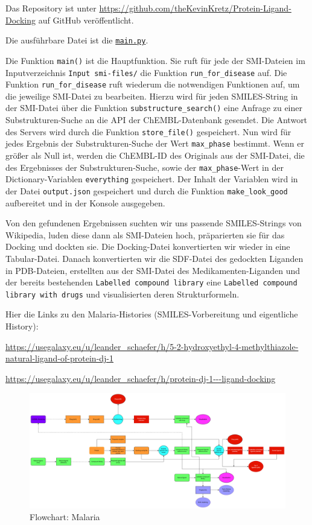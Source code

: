 \documentclass[10pt]{article}
\begin{document}
    Das Repository ist unter \url{https://github.com/theKevinKretz/Protein-Ligand-Docking} auf
    GitHub veröffentlicht.

    Die ausführbare Datei ist
    die \href{https://github.com/theKevinKretz/Protein-Ligand-Docking/blob/master/main.py}{\texttt{main.py}}.

    Die Funktion \texttt{main()} ist die Hauptfunktion.
    Sie ruft für jede der SMI-Dateien im Inputverzeichnis \texttt{Input smi-files/} die Funktion
    \texttt{run\_for\_disease} auf.
    Die Funktion \texttt{run\_for\_disease} ruft wiederum die notwendigen Funktionen auf, um die jeweilige SMI-Datei
    zu bearbeiten.
    Hierzu wird für jeden SMILES-String in der SMI-Datei über die Funktion \texttt{substructure\_search()} eine
    Anfrage zu einer Substrukturen-Suche an die API der ChEMBL-Datenbank gesendet.
    Die Antwort des Servers wird durch die Funktion \texttt{store\_file()} gespeichert.
    Nun wird für jedes Ergebnis der Substrukturen-Suche der Wert \texttt{max\_phase} bestimmt.
    Wenn er größer als Null ist, werden die ChEMBL-ID des Originals aus der SMI-Datei, die des Ergebnisses der
    Substrukturen-Suche, sowie der \texttt{max\_phase}-Wert in der Dictionary-Variablen \texttt{everything} gespeichert.
    Der Inhalt der Variablen wird in der Datei \texttt{output.json} gespeichert und durch die Funktion
    \texttt{make\_look\_good} aufbereitet und in der Konsole ausgegeben.

    Von den gefundenen Ergebnissen suchten wir uns passende SMILES-Strings von Wikipedia, luden diese dann als
    SMI-Dateien hoch, präparierten sie für das Docking und dockten sie. Die Docking-Datei konvertierten wir wieder in
    eine Tabular-Datei. Danach konvertierten wir die SDF-Datei des gedockten Liganden in PDB-Dateien, erstellten aus
    der SMI-Datei des Medikamenten-Liganden und der bereits bestehenden \texttt{Labelled compound library} eine
    \texttt{Labelled compound library with drugs} und visualisierten deren Strukturformeln.

    Hier die Links zu den Malaria-Histories (SMILES-Vorbereitung und eigentliche History):

    \url{https://usegalaxy.eu/u/leander_schaefer/h/5-2-hydroxyethyl-4-methylthiazole-natural-ligand-of-protein-dj-1}

    \url{https://usegalaxy.eu/u/leander_schaefer/h/protein-dj-1---ligand-docking}


    \begin{figure}[H]
        \centering
        \includegraphics[width=0.7\linewidth]{malaria-flowchart}
        \caption{Flowchart: Malaria}
    \end{figure}
\end{document}
